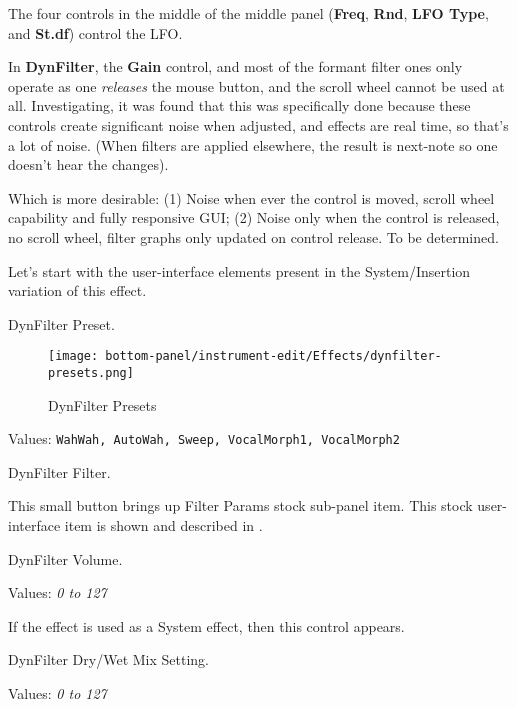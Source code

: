    The four controls in the middle of the middle panel
   (\textbf{Freq}, \textbf{Rnd}, \textbf{LFO Type}, and \textbf{St.df})
   control the LFO.

   In \textbf{DynFilter}, the \textbf{Gain} control, and most of the formant
   filter ones only operate as one \textsl{releases} the mouse button, and the
   scroll wheel cannot be used at all.  Investigating, it was found that this
   was specifically done because these controls create significant noise when
   adjusted, and effects are real time, so that's a lot of noise. (When filters
   are applied elsewhere, the result is next-note so one doesn't hear the
   changes).

   Which is more desirable:
   (1) Noise when ever the control is moved, scroll wheel capability and fully
   responsive GUI;
   (2) Noise only when the control is released, no scroll wheel, filter graphs
   only updated on control release.
   To be determined.

   Let's start with the user-interface elements present in the
   System/Insertion variation of this effect.

   \setcounter{ItemCounter}{0}      %

   DynFilter Preset.

\begin{figure}[H]
   \centering
   \texttt{[image: bottom-panel/instrument-edit/Effects/dynfilter-presets.png]}
   \caption{DynFilter Presets}
   \label{fig:effects_dynfilter_presets}
\end{figure}

   Values: \texttt{WahWah, AutoWah, Sweep, VocalMorph1, VocalMorph2}

   DynFilter Filter.

   This small button brings up Filter Params stock sub-panel item.
   This stock user-interface item is shown and described in
   .

   DynFilter Volume.

   Values: \textsl{0 to 127}

   If the effect is used as a System effect, then this control appears.

   DynFilter Dry/Wet Mix Setting.

   Values: \textsl{0 to 127}

